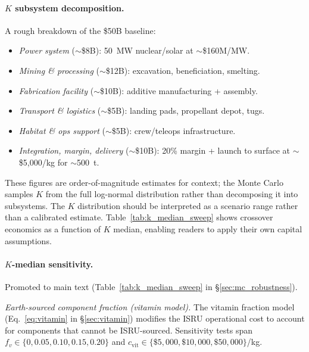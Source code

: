 \documentclass[preprint,12pt]{elsarticle}
\begin{document}
\paragraph{$K$ subsystem decomposition.} A rough breakdown of the \$50B baseline:
\begin{itemize}
  \item \emph{Power system} (${\sim}$\$8B): 50~MW nuclear/solar at ${\sim}$\$160M/MW.
  \item \emph{Mining \& processing} (${\sim}$\$12B): excavation, beneficiation, smelting.
  \item \emph{Fabrication facility} (${\sim}$\$10B): additive manufacturing + assembly.
  \item \emph{Transport \& logistics} (${\sim}$\$5B): landing pads, propellant depot, tugs.
  \item \emph{Habitat \& ops support} (${\sim}$\$5B): crew/teleops infrastructure.
  \item \emph{Integration, margin, delivery} (${\sim}$\$10B): 20\% margin + launch to surface at ${\sim}$\$5{,}000/kg for ${\sim}$500~t.
\end{itemize}
These figures are order-of-magnitude estimates for context; the Monte Carlo samples $K$ from the full log-normal distribution rather than decomposing it into subsystems. The $K$ distribution should be interpreted as a scenario range rather than a calibrated estimate. Table~\ref{tab:k_median_sweep} shows crossover economics as a function of $K$ median, enabling readers to apply their own capital assumptions.

\paragraph{$K$-median sensitivity.} Promoted to main text (Table~\ref{tab:k_median_sweep} in \S\ref{sec:mc_robustness}).

\emph{Earth-sourced component fraction (vitamin model).} The vitamin fraction model (Eq.~\ref{eq:vitamin} in \S\ref{sec:vitamin}) modifies the ISRU operational cost to account for components that cannot be ISRU-sourced. Sensitivity tests span $f_v \in \{0, 0.05, 0.10, 0.15, 0.20\}$ and $c_{\mathrm{vit}} \in \{\$5{,}000, \$10{,}000, \$50{,}000\}$/kg.
\end{document}

